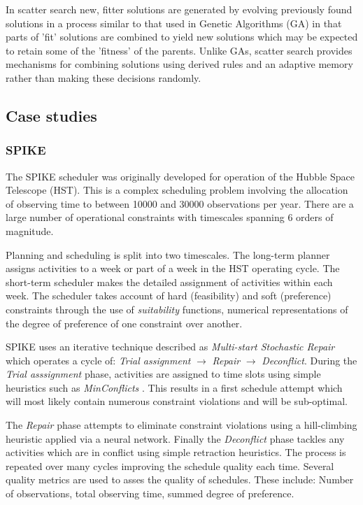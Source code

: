 \begin{description}
In scatter search \citep{glover03scatter} new, fitter solutions are generated by evolving previously found solutions in a process similar to that used in Genetic Algorithms (GA) in that parts of 'fit' solutions are combined to yield new solutions which may be expected to retain some of the 'fitness' of the parents. Unlike GAs, scatter search provides mechanisms for combining solutions using derived rules and an adaptive memory rather than making these decisions randomly.

\end{description}

\subsection{Case studies}
\label{sub:review_casestudy}

\subsubsection{SPIKE}
The SPIKE scheduler \citep{johnston94spike} was originally developed for operation of the Hubble Space Telescope (HST). This is a complex scheduling problem involving the allocation of observing time to between 10000 and 30000 observations per year. There are a large number of operational constraints with timescales spanning 6 orders of magnitude. 

Planning and scheduling is split into two timescales. The long-term planner assigns activities to a week or part of a week in the HST operating cycle. The short-term scheduler makes the detailed assignment of activities within each week. The scheduler takes account of hard (feasibility) and soft (preference) constraints through the use of \emph{suitability} functions, numerical representations of the degree of preference of one constraint over another. 

SPIKE uses an iterative technique described as \emph{Multi-start Stochastic Repair} which operates a cycle of: \emph{Trial assignment} $\rightarrow$ \emph{Repair} $\rightarrow$ \emph{Deconflict}. During the \emph{Trial asssignment} phase, activities are assigned to time slots using simple heuristics such as \emph{MinConflicts} \citep{minton92minconflicts}. This results in a first schedule attempt which will most likely contain numerous constraint violations and will be sub-optimal. 

The \emph{Repair} phase attempts to eliminate constraint violations using a hill-climbing heuristic applied via a neural network. Finally the \emph{Deconflict} phase tackles any activities which are in conflict using simple retraction heuristics. The process is repeated over many cycles improving the schedule quality each time. Several quality metrics are used to asses the quality of schedules. These include: Number of observations, total observing time, summed degree of preference. 


